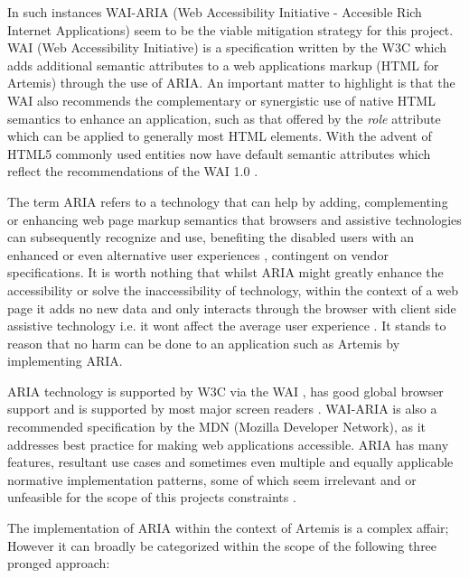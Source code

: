 In such instances WAI-ARIA (Web Accessibility Initiative - Accesible Rich Internet Applications)  \cite{W3C,February2016a,Sukardi2016} seem to be the viable mitigation strategy for this project. WAI (Web Accessibility Initiative) is a specification written by the W3C \cite{W3C,Sukardi2016} which adds additional semantic attributes to a web application\textquotesingle s markup (HTML for Artemis) through the use of ARIA. An important matter to highlight is that the WAI also recommends the complementary or synergistic use of native HTML semantics to enhance an application, such as that offered by the \textit{role} attribute which can be applied to generally most HTML elements. With the advent of HTML5 commonly used entities now have default semantic attributes which reflect the recommendations of the WAI 1.0 \cite{W3C2014,CraigJamesH}.

The term ARIA refers to  a technology that can help  by adding, complementing or enhancing web page markup semantics that browsers and assistive technologies can subsequently recognize and use, benefiting the disabled users with an enhanced or even alternative user experiences \cite{W3C, W3C2014,Sukardi2016}, contingent on vendor specifications. It is worth nothing that whilst ARIA might greatly enhance the accessibility or solve the inaccessibility of technology, within the context of a web page it adds no new data and only interacts through the browser with client side assistive technology i.e. it wont affect the average user experience \cite{W3C2014,CraigJamesH}. It stands to reason that no harm can be done to an application such as Artemis by implementing ARIA.

ARIA technology is supported by W3C via the WAI \cite{W3C,February2016a}, has good global browser support \cite{Sukardi2016} and is supported by most major screen readers \cite{Sukardi2016}. WAI-ARIA is also a recommended specification by the MDN (Mozilla Developer Network)\cite{Mills2016}, as it addresses best practice for making web applications accessible. ARIA has many features, resultant use cases and sometimes even multiple and equally applicable normative implementation patterns\cite{MozillaDeveloperNetwork,MozillaDeveloperNetworkb}, some of which seem irrelevant and or unfeasible for the scope of this project\textquotesingle s constraints \cite{February2016a}.

The implementation of ARIA within the context of Artemis is a complex affair; However it can broadly be categorized within the scope of the following three pronged approach:

